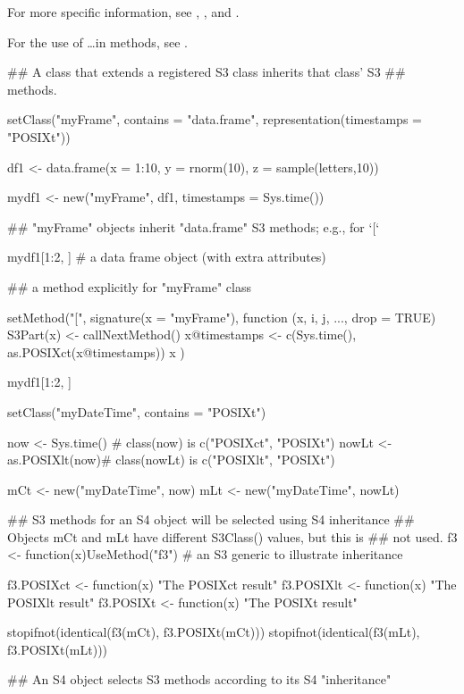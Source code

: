 %
\begin{SeeAlso}\relax
For more specific information, see
, , and
.

For the use of \dots in methods, see  .
\end{SeeAlso}
%
\begin{Examples}
\begin{ExampleCode}
## A class that extends a registered S3 class inherits that class' S3
## methods.

setClass("myFrame", contains = "data.frame",
    representation(timestamps = "POSIXt"))

df1 <- data.frame(x = 1:10, y = rnorm(10), z = sample(letters,10))

mydf1 <- new("myFrame", df1, timestamps = Sys.time())

## "myFrame" objects inherit "data.frame" S3 methods; e.g., for `[`

mydf1[1:2, ] # a data frame object (with extra attributes)

## a method explicitly for "myFrame" class


setMethod("[",
    signature(x = "myFrame"),
    function (x, i, j, ..., drop = TRUE) 
    {
        S3Part(x) <- callNextMethod()
        x@timestamps <- c(Sys.time(), as.POSIXct(x@timestamps))
        x
    }
)

mydf1[1:2, ]


setClass("myDateTime", contains = "POSIXt")

now <- Sys.time() # class(now) is c("POSIXct", "POSIXt")
nowLt <- as.POSIXlt(now)# class(nowLt) is c("POSIXlt", "POSIXt")

mCt <- new("myDateTime", now)
mLt <- new("myDateTime", nowLt)

## S3 methods for an S4 object will be selected using S4 inheritance
## Objects mCt and mLt have different S3Class() values, but this is
## not used.
f3 <- function(x)UseMethod("f3") # an S3 generic to illustrate inheritance

f3.POSIXct <- function(x) "The POSIXct result"
f3.POSIXlt <- function(x) "The POSIXlt result"
f3.POSIXt <- function(x) "The POSIXt result"

stopifnot(identical(f3(mCt), f3.POSIXt(mCt)))
stopifnot(identical(f3(mLt), f3.POSIXt(mLt)))



## An S4 object selects S3 methods according to its S4 "inheritance"



\end{ExampleCode}
\end{Examples}
